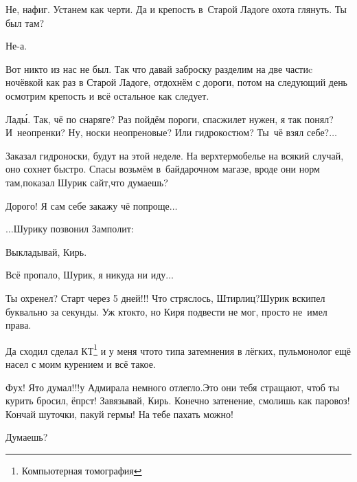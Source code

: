 \diagdash Не, нафиг. Устанем как черти. Да и крепость в~Старой Ладоге охота глянуть. Ты был там?

\diagdash Не-а.

\diagdash Вот никто из нас не был. Так что давай заброску разделим на две части\mdash c ночёвкой как раз в Старой Ладоге, отдохнём с дороги, потом на следующий день осмотрим крепость и всё остальное как следует.

\diagdash Лад\'{ы}. Так, чё по снаряге? Раз пойдём пороги, спасжилет нужен, я так понял? И~неопренки? Ну, носки неопреновые? Или гидрокостюм? Ты~чё взял себе?$\ldots$

\diagdash Заказал гидроноски, будут на этой неделе. На верх\mdash термобелье на всякий случай, оно сохнет быстро. Спасы возьмём в~байдарочном магазе, вроде они норм там,\mdash показал Шурик сайт,\mdash что думаешь?

\diagdash Дорого! Я сам себе закажу чё попроще$\ldots$




\vspace{0.4cm}
$\ldots$Шурику позвонил Замполит:

\diagdash Выкладывай, Кирь.

\diagdash Всё пропало, Шурик, я никуда ни иду$\ldots$

\diagdash Ты охренел? Старт через 5 дней!!! Что стряслось, Штирлиц?\mdash Шурик вскипел буквально за секунды. Уж кто\sdash кто, но Киря подвести не мог, просто не~имел права. 

\diagdash Да сходил сделал КТ\footnote{Компьютерная томография} и у меня что\sdash то типа затемнения в лёгких, пульмонолог ещё насел с моим курением и всё такое.

\diagdash Фух! Я\sdash то думал!!!\mdash у Адмирала немного отлегло.\mdash Это они тебя стращают, чтоб ты курить бросил, ёпрст! Завязывай, Кирь. Конечно затенение, смолишь как паровоз! Кончай шуточки, пакуй гермы! На тебе пахать можно!

\diagdash Думаешь?

